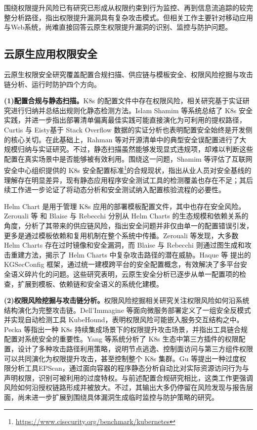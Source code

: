 围绕权限提升风险已有研究已形成从权限约束到行为监控、再到信息流追踪的较完整分析路径，指出权限提升漏洞具有复杂攻击模式。但相关工作主要针对移动应用与Web系统，尚难直接回答云原生权限提升漏洞的识别、监控与防护问题。

\subsection{云原生应用权限安全}

云原生权限安全研究覆盖配置合规扫描、供应链与模板安全、权限风险挖掘与攻击链分析、运行时防护四个方向。

\textbf{(1)配置合规与静态扫描。}K8s 的配置文件中存在权限风险，相关研究基于实证研究进行归纳并总结出规则化静态检测方法。Islam Shamim 等\cite{Islam_Shamim_2020,Shamim_2021}系统总结了 K8s 安全实践，并进一步指出部署清单偏离最佳实践可能直接演化为可利用的提权路径，Curtis 与 Eisty\cite{Curtis_2025}基于 Stack Overflow 数据的实证分析也表明配置安全始终是开发侧的核心关切。在此基础上，Rahman 等\cite{k8smanifests2023}对开源清单中的典型安全误配置进行了大规模归纳与实证研究。不过，静态扫描虽然能够发现显式违规项，却难以判断这些配置在真实场景中是否能够被有效利用。围绕这一问题，Shamim 等\cite{shamim2025prescription}评估了互联网安全中心组织提供的 K8s 安全配置标准\footnote{\url{https://www.cisecurity.org/benchmark/kubernetes}}的合规现状，指出从业人员对安全基线的理解存在明显差异，现有静态应用程序安全测试工具的检测覆盖也存在不足；其后续工作\cite{shamim2025dastk8s}进一步论证了将动态分析和安全测试纳入配置核验流程的必要性。

Helm Chart 是用于管理 K8s 应用的部署模板配置文件，其中也存在安全风险。Zerouali 等\cite{Zerouali_2023} 和 Blaise 与 Rebecchi\cite{Blaise_2022} 分别从 Helm Charts 的生态规模和依赖关系的角度，分析了其带来的供应链风险，指出安全问题并非仅由单一的配置错误引发，更多是通过模板依赖和复用机制在整个系统中传播。Zerouali 等发现，大多数 Helm Charts 存在过时镜像和安全漏洞，而 Blaise 与 Rebecchi 则通过图生成和攻击重建方法，揭示了 Helm Charts 中复杂攻击路径的潜在威胁。Haque 等\cite{KGSecConfig2022} 提出的 KGSecConfig 框架，通过统一建模跨平台的安全配置概念，有效解决了多平台安全语义碎片化的问题。这些研究表明，云原生安全分析已逐步从单一配置项的检查，扩展到模板、依赖链和安全语义的系统化建模。

\textbf{(2)权限风险挖掘与攻击链分析。}权限风险挖掘相关研究关注权限风险如何沿系统结构演化为完整攻击链。Dell'Immagine 等\cite{Dell_Immagine_2023}面向微服务部署定义了一组安全反模式并实现自动检测工具 KubeHound，表明权限风险可能嵌入服务交互结构之中。Pecka 等\cite{pecka2022privilege}指出一种 K8s 持续集成场景下的权限提升攻击场景，并指出工具链合规配置对系统安全的重要性。Yang 等\cite{yang2023take}系统分析了 K8s 生态中第三方插件的权限配置，设计了多种攻击路径利用策略，说明节点逃逸、控制面访问与第三方组件权限可以共同演化为权限提升攻击，甚至控制整个 K8s 集群。Gu 等\cite{gu2024epscan}提出一种过度权限分析工具EPScan，通过面向容器的程序静态分析自动比对实际资源访问行为与声明权限，识别可被利用的过度特权。与前述配置合规研究相比，这类工作更强调风险如何沿授权链路形成并被放大。不过，其输出大多仍停留在风险发现与报告层面，尚未进一步扩展到围绕具体漏洞生成临时监控与防护策略的研究。

